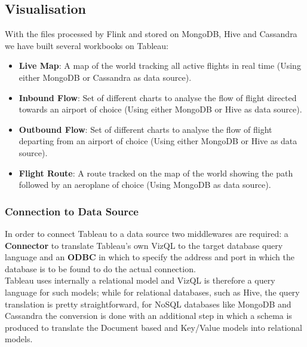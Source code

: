 \subsection{Visualisation}

With the files processed by Flink and stored on MongoDB, Hive and Cassandra we have built several workbooks on Tableau:

\begin{itemize}
	\item \textbf{Live Map}: A map of the world tracking all active flights in real time (Using either MongoDB or Cassandra as data source).
	\item \textbf{Inbound Flow}: Set of different charts to analyse the flow of flight directed towards an airport of choice (Using either MongoDB or Hive as data source).
	\item \textbf{Outbound Flow}: Set of different charts to analyse the flow of flight departing from an airport of choice (Using either MongoDB or Hive as data source).
	\item \textbf{Flight Route}: A route tracked on the map of the world showing the path followed by an aeroplane of choice (Using MongoDB as data source).
\end{itemize}
\subsubsection{Connection to Data Source}

In order to connect Tableau to a data source two middlewares are required: a \textbf{Connector} to translate Tableau's own VizQL to the target database query language and an \textbf{ODBC} in which to specify the address and port in which the database is to be found to do the actual connection.
\\
Tableau uses internally a relational model and VizQL is therefore a query language for such models; while for relational databases, such as Hive, the query translation is pretty straightforward, for NoSQL databases like MongoDB and Cassandra the conversion is done with an additional step in which a schema is produced to translate the Document based and Key/Value models into relational models.

